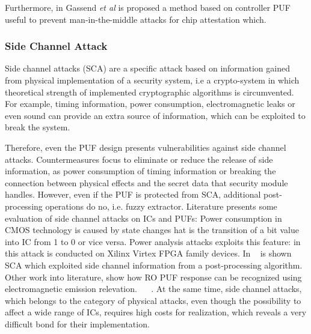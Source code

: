 \documentclass[../tesi.tex]{subfiles}
\begin{document}
Furthermore, in \cite{gassend2002controlled} Gassend \emph{et al} is proposed a method based on controller PUF useful to prevent man-in-the-middle attacks for chip attestation which.
\subsubsection{Side Channel Attack} \label{par:sca}
Side channel attacks (SCA) are a specific attack based on information gained from physical implementation of a security system, i.e a crypto-system in which theoretical strength of implemented cryptographic algorithms is circumvented. For example, timing information, power consumption, electromagnetic leaks or even sound can provide an extra source of information, which can be exploited to break the system. 

Therefore, even the PUF design presents vulnerabilities against side channel attacks. Countermeasures focus to eliminate or reduce the release of side information, as power consumption of timing information or breaking the connection between physical effects and the secret data that security module handles.  However, even if the PUF is protected from SCA, additional post-processing operations do no,  i.e. fuzzy extractor. 
Literature presents some evaluation of side channel attacks on ICs and PUFs:
Power consumption in CMOS technology is caused by state changes hat is the transition of a bit value into IC from 1 to 0 or vice versa. Power analysis attacks exploits this feature: in \cite{ors2003power} this attack is conducted on Xilinx Virtex FPGA family devices.
In ~\cite{karakoyunlu2010differential} is shown SCA which exploited side channel information from a post-processing algorithm. Other work into literature, show how RO PUF response can be recognized using electromagnetic emission relevation. ~\cite{merli2011semi} ~\cite{merli2013localized}.   
At the same time, side channel attacks, which belongs to the category of physical attacks, even though the possibility to affect a wide range of ICs, requires high costs for realization, which reveals a very difficult bond for their implementation.  
\end{document}

